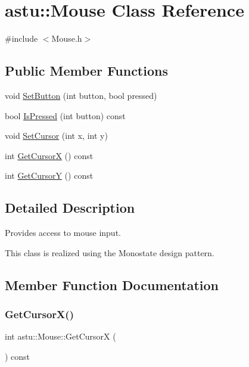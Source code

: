 \hypertarget{classastu_1_1Mouse}{}\section{astu\+:\+:Mouse Class Reference}
\label{classastu_1_1Mouse}


{\ttfamily \#include $<$Mouse.\+h$>$}

\subsection*{Public Member Functions}
\begin{DoxyCompactItemize}
\item 
void \hyperlink{classastu_1_1Mouse_a1f60d23fe113d85a80569a5a3539eabf}{Set\+Button} (int button, bool pressed)
\item 
bool \hyperlink{classastu_1_1Mouse_a400f6483be85ac0e4694806bdd22e25a}{Is\+Pressed} (int button) const
\item 
void \hyperlink{classastu_1_1Mouse_a1aebb61a647f115381eeb2d3528fefe8}{Set\+Cursor} (int x, int y)
\item 
int \hyperlink{classastu_1_1Mouse_a22202c4dec1e13df857a524df45b4fc0}{Get\+CursorX} () const
\item 
int \hyperlink{classastu_1_1Mouse_a8f008ad4c4a9cba165ff74e44b0bdb17}{Get\+CursorY} () const
\end{DoxyCompactItemize}


\subsection{Detailed Description}
Provides access to mouse input.

This class is realized using the Monostate design pattern. 

\subsection{Member Function Documentation}
\mbox{\label{classastu_1_1Mouse_a22202c4dec1e13df857a524df45b4fc0}} 
\subsubsection{\texorpdfstring{Get\+Cursor\+X()}{GetCursorX()}}
{\footnotesize\ttfamily int astu\+::\+Mouse\+::\+Get\+CursorX (\begin{DoxyParamCaption}{ }\end{DoxyParamCaption}) const}

